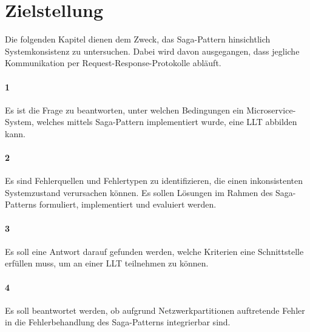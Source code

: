 \section{Zielstellung} \label{sec:zielstellung}

Die folgenden Kapitel dienen dem Zweck, das Saga-Pattern hinsichtlich Systemkonsistenz zu untersuchen. Dabei wird davon ausgegangen, dass jegliche Kommunikation per Request-Response-Protokolle abläuft. 

\paragraph*{1}
Es ist die Frage zu beantworten, unter welchen Bedingungen ein Microservice-System, welches mittels Saga-Pattern implementiert wurde, eine LLT abbilden kann. 

\paragraph*{2}
Es sind Fehlerquellen und Fehlertypen zu identifizieren, die einen inkonsistenten Systemzustand verursachen können. Es sollen Lösungen im Rahmen des Saga-Patterns formuliert, implementiert und evaluiert werden. 

\paragraph*{3}
Es soll eine Antwort darauf gefunden werden, welche Kriterien eine Schnittstelle erfüllen muss, um an einer LLT teilnehmen zu können.

\paragraph*{4}
Es soll beantwortet werden, ob aufgrund Netzwerkpartitionen auftretende Fehler in die Fehlerbehandlung des Saga-Patterns integrierbar sind. 



